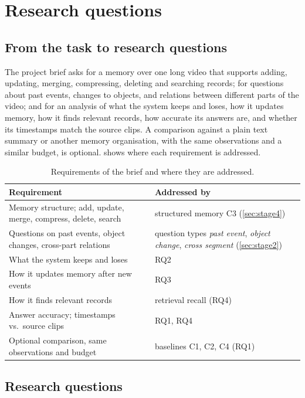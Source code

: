 \section{Research questions}\label{sec:rq}

\subsection{From the task to research questions}
The project brief asks for a memory over one long video that supports adding,
updating, merging, compressing, deleting and searching records; for questions
about past events, changes to objects, and relations between different parts
of the video; and for an analysis of what the system keeps and loses, how it
updates memory, how it finds relevant records, how accurate its answers are,
and whether its timestamps match the source clips. A comparison against a plain
text summary or another memory organisation, with the same observations and a
similar budget, is optional.  shows where each requirement
is addressed.

\begin{table}[ht]
\centering\small
\caption{Requirements of the brief and where they are addressed.}\label{tab:task-map}
\begin{tabularx}{\linewidth}{@{}XX@{}}
\toprule
Requirement & Addressed by \\
\midrule
Memory structure; add, update, merge, compress, delete, search &
  structured memory C3 (\cref{sec:stage4}) \\
Questions on past events, object changes, cross-part relations &
  question types \emph{past event}, \emph{object change}, \emph{cross segment}
  (\cref{sec:stage2}) \\
What the system keeps and loses & RQ2 \\
How it updates memory after new events & RQ3 \\
How it finds relevant records & retrieval recall (RQ4) \\
Answer accuracy; timestamps vs.\ source clips & RQ1, RQ4 \\
Optional comparison, same observations and budget & baselines C1, C2, C4 (RQ1) \\
\bottomrule
\end{tabularx}
\end{table}

\subsection{Research questions}

